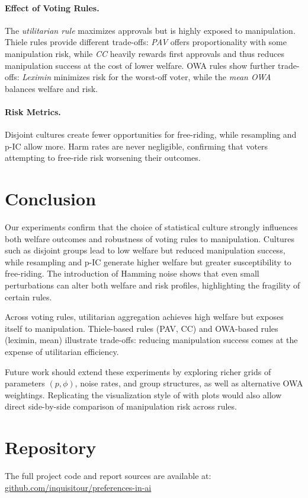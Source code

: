 \documentclass[11pt]{article}
\begin{document}
\paragraph{Effect of Voting Rules.}
The \emph{utilitarian rule} maximizes approvals but is highly exposed to
manipulation. Thiele rules provide different trade-offs: \emph{PAV} offers
proportionality with some manipulation risk, while \emph{CC} heavily rewards
first approvals and thus reduces manipulation success at the cost of lower
welfare. OWA rules show further trade-offs: \emph{Leximin} minimizes risk for
the worst-off voter, while the \emph{mean OWA} balances welfare and risk.

\paragraph{Risk Metrics.}
Disjoint cultures create fewer opportunities for free-riding, while resampling
and p-IC allow more. Harm rates are never negligible, confirming that voters
attempting to free-ride risk worsening their outcomes.

\section{Conclusion}
Our experiments confirm that the choice of statistical culture strongly
influences both welfare outcomes and robustness of voting rules to manipulation.
Cultures such as disjoint groups lead to low welfare but reduced manipulation
success, while resampling and p-IC generate higher welfare but greater
susceptibility to free-riding. The introduction of Hamming noise shows that
even small perturbations can alter both welfare and risk profiles, highlighting
the fragility of certain rules.

Across voting rules, utilitarian aggregation achieves high welfare but exposes
itself to manipulation. Thiele-based rules (PAV, CC) and OWA-based rules
(leximin, mean) illustrate trade-offs: reducing manipulation success comes at
the expense of utilitarian efficiency.

Future work should extend these experiments by exploring richer grids of
parameters $(p,\phi)$, noise rates, and group structures, as well as alternative
OWA weightings. Replicating the visualization style of
\cite{lackner2023freeriding} with plots would also allow direct side-by-side
comparison of manipulation risk across rules.

\section*{Repository}
The full project code and report sources are available at: \\
\href{https://github.com/inquisitour/preferences-in-ai}{github.com/inquisitour/preferences-in-ai}
\end{document}
